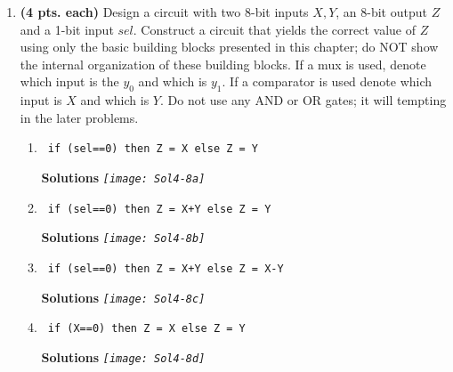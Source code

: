\begin{enumerate}
            \item \textbf{ (4 pts. each)} Design a circuit with two 8-bit inputs $X,Y$, an
                8-bit output $Z$ and a 1-bit input $sel$.  Construct a circuit that yields the
                correct value of $Z$ using only the basic building blocks presented in this
                chapter; do NOT show the internal organization of these building blocks.  If
                a mux is used, denote which input is the $y_0$ and which is $y_1$.
                If a comparator is used denote which input is $X$ and which is $Y$.
                Do not use any AND or OR gates; it will tempting in the later problems.
                \begin{enumerate}
                    \item \verb^ if (sel==0) then Z = X else Z = Y ^

                        \begin{onlysolution} \textbf{Solutions} \itshape{
                                \texttt{[image: Sol4-8a]}
                            }
                        \end{onlysolution}

                    \item \verb^ if (sel==0) then Z = X+Y else Z = Y ^

                        \begin{onlysolution} \textbf{Solutions} \itshape{
                                \texttt{[image: Sol4-8b]}
                            }
                        \end{onlysolution}

                    \item \verb^ if (sel==0) then Z = X+Y else Z = X-Y ^

                        \begin{onlysolution} \textbf{Solutions} \itshape{
                                \texttt{[image: Sol4-8c]}
                            }
                        \end{onlysolution}

                    \item \verb^ if (X==0) then Z = X else Z = Y ^

                        \begin{onlysolution} \textbf{Solutions} \itshape{
                                \texttt{[image: Sol4-8d]}
                            }
                        \end{onlysolution}


\end{enumerate}
\end{enumerate}

